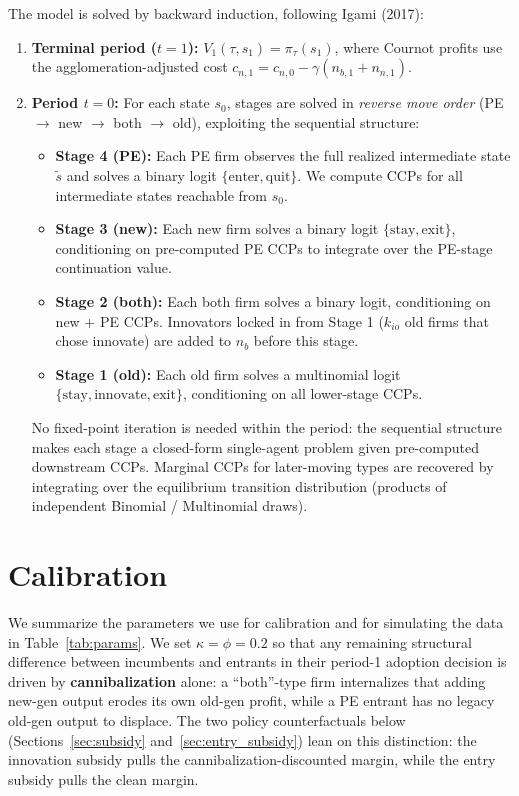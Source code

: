 \documentclass[12pt]{article}
\begin{document}
The model is solved by backward induction, following Igami (2017):
\begin{enumerate}
  \item \textbf{Terminal period ($t=1$):} $V_1(\tau, s_1) = \pi_\tau(s_1)$,
        where Cournot profits use the agglomeration-adjusted cost
        $c_{n,1} = c_{n,0} - \gamma(n_{b,1} + n_{n,1})$.
  \item \textbf{Period $t=0$:} For each state $s_0$, stages are solved in
        \emph{reverse move order} (PE $\to$ new $\to$ both $\to$ old),
        exploiting the sequential structure:
        \begin{itemize}
          \item \textbf{Stage 4 (PE):} Each PE firm observes the full
                realized intermediate state $\tilde{s}$ and solves a binary
                logit $\{\text{enter}, \text{quit}\}$. We compute CCPs for
                all intermediate states reachable from $s_0$.
          \item \textbf{Stage 3 (new):} Each new firm solves a binary logit
                $\{\text{stay}, \text{exit}\}$, conditioning on pre-computed
                PE CCPs to integrate over the PE-stage continuation value.
          \item \textbf{Stage 2 (both):} Each both firm solves a binary
                logit, conditioning on new + PE CCPs. Innovators locked in
                from Stage 1 ($k_{io}$ old firms that chose innovate) are
                added to $n_b$ before this stage.
          \item \textbf{Stage 1 (old):} Each old firm solves a multinomial
                logit $\{\text{stay}, \text{innovate}, \text{exit}\}$,
                conditioning on all lower-stage CCPs.
        \end{itemize}
        No fixed-point iteration is needed within the period: the sequential
        structure makes each stage a closed-form single-agent problem given
        pre-computed downstream CCPs. Marginal CCPs for later-moving types
        are recovered by integrating over the equilibrium transition
        distribution (products of independent Binomial / Multinomial draws).
\end{enumerate}

\section{Calibration}

We summarize the parameters we use for calibration and for simulating
the data in Table~\ref{tab:params}. We set $\kappa = \phi = 0.2$ so that
any remaining structural difference between incumbents and entrants in
their period-1 adoption decision is driven by \textbf{cannibalization}
alone: a ``both''-type firm internalizes that adding new-gen output
erodes its own old-gen profit, while a PE entrant has no legacy old-gen
output to displace. The two policy counterfactuals below
(Sections~\ref{sec:subsidy} and~\ref{sec:entry_subsidy}) lean on this
distinction: the innovation subsidy pulls the cannibalization-discounted
margin, while the entry subsidy pulls the clean margin.\\
\end{document}
